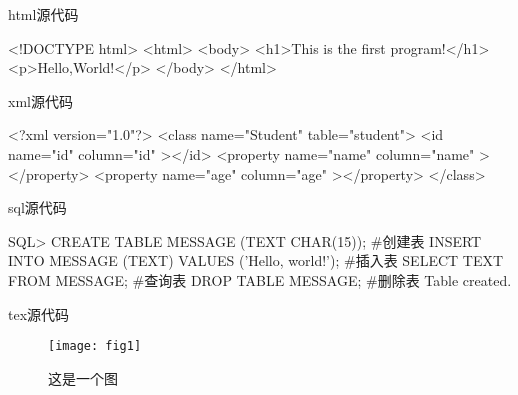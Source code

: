 html源代码
\begin{html}
    <!DOCTYPE html>  
    <html>  
        <body>  
            <h1>This is the first program!</h1>  
            <p>Hello,World!</p>  
        </body>  
    </html>
\end{html}

xml源代码 
\begin{xml}
    <?xml version="1.0"?>
    <class name="Student" table="student">
        <id name="id" column="id" ></id>
        <property name="name" column="name" ></property>
        <property name="age" column="age" ></property>
    </class> 
\end{xml}

sql源代码 
\begin{sql}
    SQL> CREATE TABLE MESSAGE (TEXT CHAR(15));            #创建表  
    INSERT INTO MESSAGE (TEXT) VALUES ('Hello, world!');  #插入表  
    SELECT TEXT FROM MESSAGE;                             #查询表  
    DROP TABLE MESSAGE;                                   #删除表               
    Table created.   
\end{sql}

tex源代码 
\begin{tex}
    \begin{figure}[H]
        \centering 
        \texttt{[image: fig1]} 
        \caption{这是一个图}
        \label{fig:single}
    \end{figure}
\end{tex}
